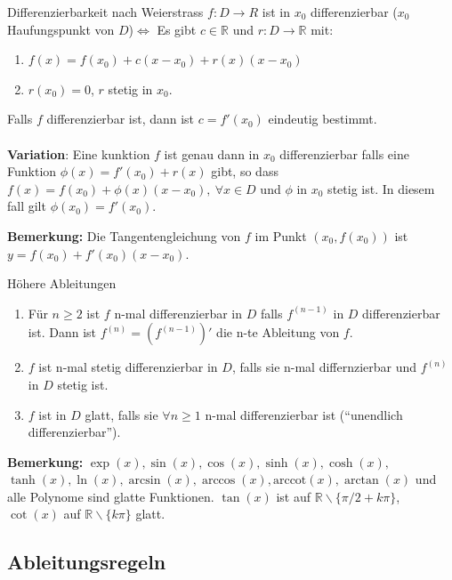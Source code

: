 \documentclass[a4paper,8pt]{extarticle}
\newenvironment{bemerkung}{
   \noindent \textbf{Bemerkung:  }}{}
\def\R{\mathbb{R}}
\begin{document}
\begin{subbox}{Differenzierbarkeit nach Weierstrass}
 $f: D \rightarrow R$ ist in $x_0$ differenzierbar ($x_0$ Haufungspunkt von $D$)$\iff$ Es gibt $c \in \R$ und $r: D \to \R$ mit:
 \begin{enumerate}
   \item $f(x) = f(x_0) + c(x - x_0) + r(x) (x - x_0)$ 
   \item $r(x_0) = 0$, $r$ stetig in $x_0$.
 \end{enumerate}
 Falls $f$ differenzierbar ist, dann ist $c = f'(x_0)$ eindeutig bestimmt. \\ \\
 \textbf{Variation}: Eine kunktion $f$ ist genau dann in $x_0$ differenzierbar falls eine Funktion $\phi(x) = f'(x_0) + r(x)$ gibt, so dass $f(x) = f(x_0) + \phi(x) (x-x_0), \ \forall x \in D$ und $\phi$ in $x_0$ stetig ist. In diesem fall gilt $\phi(x_0) = f'(x_0)$.
\end{subbox}
\begin{bemerkung}
  Die Tangentengleichung von $f$ im Punkt $(x_0, f(x_0))$ ist $y = f(x_0) + f'(x_0)(x - x_0)$.
\end{bemerkung}

\begin{mainbox}{Höhere Ableitungen}
 \begin{enumerate}
  \item Für $n \ge 2$ ist $f$ n-mal differenzierbar in $D$ falls $f^{(n-1)}$ in $D$ differenzierbar ist. Dann ist $f^{(n)} = (f^{(n-1)})'$ die n-te Ableitung von $f$.
  \item $f$ ist n-mal stetig differenzierbar in $D$, falls sie n-mal differnzierbar und $f^{(n)}$ in $D$ stetig ist.
  \item $f$ ist in $D$ glatt, falls sie $\forall n \ge 1$ n-mal differenzierbar ist (``unendlich differenzierbar'').
 \end{enumerate}
\end{mainbox}
\begin{bemerkung}
  $\exp(x), \sin(x), \cos(x), \sinh(x), \cosh(x),$ \\ $ \tanh(x), \ln(x), \arcsin(x), \arccos(x), \text{arccot}(x), \arctan(x)$ und alle Polynome sind glatte Funktionen. $\tan(x)$ ist auf $\R \backslash \{\pi/2 + k\pi\}$, $\cot(x)$ auf $\R \backslash \{k\pi\}$ glatt.
\end{bemerkung}

\subsection{Ableitungsregeln}
\end{document}
